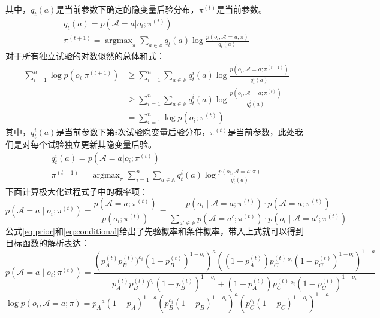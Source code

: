 \documentclass[12pt,a4paper]{article}
\DeclareMathOperator*{\argmax}{argmax}
\begin{document}
其中，$q_t(a)$是当前参数下确定的隐变量后验分布，$\pi^{(t)}$是当前参数。
\begin{gather}
q_t(a) = p(\mathcal{A}=a|o_i;\pi^{(t)})\\
\pi^{(t+1)} = \argmax_{\pi}  \sum_{a \in \mathbb{A}} q_t(a) \log \frac{p(o_i, \mathcal{A}=a;\pi)}{q_t(a)}
\end{gather}
对于所有独立试验的对数似然的总体和式：
\begin{equation}\label{eq:overall_likelihood}
\begin{split}
 \sum_{i=1}^n \log p(o_i|\pi^{(t+1)})&\geq \sum_{i=1}^n \sum_{a \in \mathbb{A}}q_t^i(a)\log \frac{p(o_i,\mathcal{A}=a;\pi^{(t+1)})}{q_t^i(a)} \\
&\geq \sum_{i=1}^n \sum_{a \in \mathbb{A}}q_t^i(a)\log \frac{p(o_i,\mathcal{A}=a;\pi^{(t)})}{q_t^i(a)} \\
&=\sum_{i=1}^n \log p(o_i;\pi^{(t)})
\end{split}
\end{equation}
其中，$q_t^i(a)$是当前参数下第$i$次试验隐变量后验分布，$\pi^{(t)}$是当前参数，此处我们是对每个试验独立更新其隐变量后验。
\begin{gather}
q_t^i(a) = p(\mathcal{A}=a|o_i;\pi^{(t)})\\
\pi^{(t+1)} = \argmax_{\pi}\sum_{i=1}^n  \sum_{a \in \mathbb{A}} q_t^i(a) \log \frac{p(o_i, \mathcal{A}=a;\pi)}{q_t^i(a)}
\end{gather}
下面计算极大化过程式子中的概率项：
\begin{equation}
p(\mathcal{A}=a \mid o_i; \pi^{(t)}) = 
\frac{p(\mathcal{A}=a; \pi^{(t)})}{p(o_i; \pi^{(t)})} = 
\frac{p(o_i \mid \mathcal{A}=a; \pi^{(t)}) \cdot p(\mathcal{A}=a; \pi^{(t)})}
{\sum_{a' \in \mathbb{A}} p(\mathcal{A}=a'; \pi^{(t)}) \cdot p(o_i \mid \mathcal{A}=a'; \pi^{(t)})}
\end{equation}
公式\ref{eq:prior}和\ref{eq:conditional}给出了先验概率和条件概率，带入上式就可以得到目标函数的解析表达：
\begin{equation}
p(\mathcal{A}=a \mid o_i; \pi^{(t)}) = \frac{
    \left(p_A^{(t)}p_B^{(t)})^{o_i}(1 - p_B^{(t)})^{1 - o_i}\right)^a
    \left((1 - p_A^{(t)})p_C^{(t)}{}^{\,o_i}(1 - p_C^{(t)})^{1 - o_i}\right)^{1 - a}
}{
    p_A^{(t)}  p_B^{(t)})^{o_i}(1 - p_B^{(t)})^{1 - o_i}
    + (1 - p_A^{(t)}) p_C^{(t)}{}^{\,o_i}(1 - p_C^{(t)})^{1 - o_i}
}
\end{equation}
\begin{equation}
    \log p(o_i, \mathcal{A}=a;\pi)={p_A}^a{(1-p_A)^{1-a}}(p_B^{o_i}(1-p_B)^{1-o_i})^a(p_C^{o_i}(1-p_C)^{1-o_i})^{1-a}
\end{equation}
\end{document}
